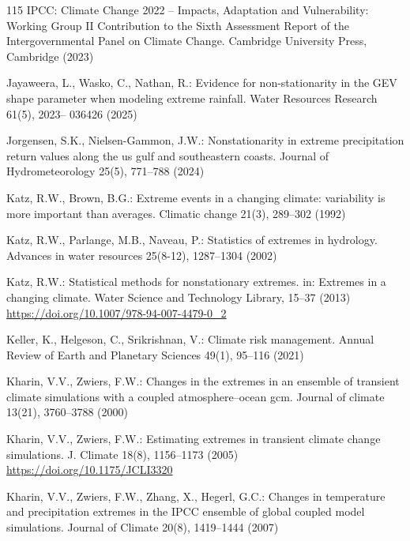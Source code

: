 \documentclass[11pt,a4paper]{article}
\begin{document}
\begin{thebibliography}{115}
		IPCC: Climate Change 2022 -- Impacts, Adaptation and Vulnerability: Working Group II Contribution to the Sixth Assessment Report of the Intergovernmental Panel on Climate Change. Cambridge University Press, Cambridge (2023)
		
		Jayaweera, L., Wasko, C., Nathan, R.: Evidence for non-stationarity in the GEV shape parameter when modeling extreme rainfall. Water Resources Research 61(5), 2023-- 036426 (2025)
		
		Jorgensen, S.K., Nielsen-Gammon, J.W.: Nonstationarity in extreme precipitation return values along the us gulf and southeastern coasts. Journal of Hydrometeorology 25(5), 771--788 (2024)
		
		Katz, R.W., Brown, B.G.: Extreme events in a changing climate: variability is more important than averages. Climatic change 21(3), 289--302 (1992)
		
		Katz, R.W., Parlange, M.B., Naveau, P.: Statistics of extremes in hydrology. Advances in water resources 25(8-12), 1287--1304 (2002)
		
		Katz, R.W.: Statistical methods for nonstationary extremes. in: Extremes in a changing climate. Water Science and Technology Library, 15--37 (2013) \url{https://doi.org/10.1007/978-94-007-4479-0_2}
		
		Keller, K., Helgeson, C., Srikrishnan, V.: Climate risk management. Annual Review of Earth and Planetary Sciences 49(1), 95--116 (2021)
		
		Kharin, V.V., Zwiers, F.W.: Changes in the extremes in an ensemble of transient climate simulations with a coupled atmosphere--ocean gcm. Journal of climate 13(21), 3760--3788 (2000)
		
		Kharin, V.V., Zwiers, F.W.: Estimating extremes in transient climate change simulations. J. Climate 18(8), 1156--1173 (2005) \url{https://doi.org/10.1175/JCLI3320}
		
		Kharin, V.V., Zwiers, F.W., Zhang, X., Hegerl, G.C.: Changes in temperature and precipitation extremes in the IPCC ensemble of global coupled model simulations. Journal of Climate 20(8), 1419--1444 (2007)
		

\end{thebibliography}
\end{document}
